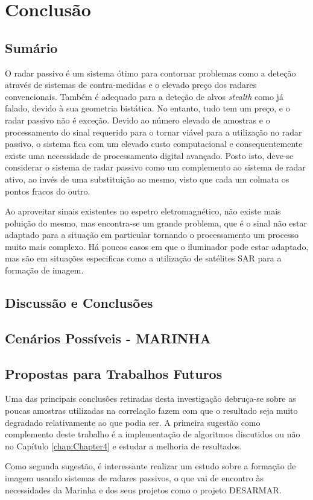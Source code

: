 
\chapter{Conclusão} %
\label{chap:Chapter6} %

\section{Sumário}
O radar passivo é um sistema ótimo para contornar problemas como a deteção através de sistemas de contra-medidas e o elevado preço dos radares convencionais. Também é adequado para a deteção de alvos \textit{stealth} como já falado, devido à sua geometria bistática. No entanto, tudo tem um preço, e o radar passivo não é exceção. Devido ao número elevado de amostras e o processamento do sinal requerido para o tornar viável para a utilização no radar passivo, o sistema fica com um elevado custo computacional e consequentemente existe uma necessidade de processamento digital avançado. Posto isto, deve-se considerar o sistema de radar passivo como um complemento ao sistema de radar ativo, ao invés de uma substituição ao mesmo, visto que cada um colmata os pontos fracos do outro.\par 
Ao aproveitar sinais existentes no espetro eletromagnético, não existe mais poluição do mesmo, mas encontra-se um grande problema, que é o sinal não estar adaptado para a situação em particular tornando o processamento um processo muito mais complexo. Há poucos casos em que o iluminador pode estar adaptado, mas são em situações especificas como a utilização de satélites \gls{SAR} para a formação de imagem.


\section{Discussão e Conclusões}



\section{Cenários Possíveis - MARINHA}



\section{Propostas para Trabalhos Futuros}
Uma das principais conclusões retiradas desta investigação debruça-se sobre as poucas amostras utilizadas na correlação fazem com que o resultado seja muito degradado relativamente ao que podia ser. A primeira sugestão como complemento deste trabalho é a implementação de algoritmos discutidos ou não no Capítulo \ref{chap:Chapter4} e estudar a melhoria de resultados.\par 
Como segunda sugestão, é interessante realizar um estudo sobre a formação de imagem usando sistemas de radares passivos, o que vai de encontro às necessidades da Marinha e dos seus projetos como o projeto DESARMAR.